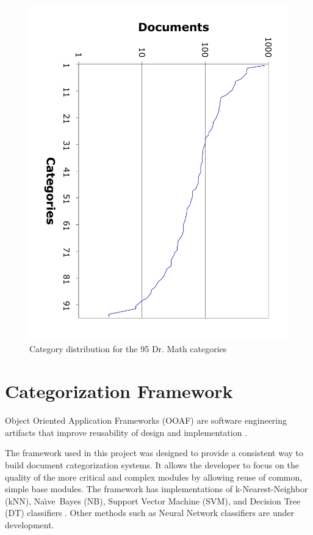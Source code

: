 \documentclass{article}
\newcommand{\naive}{Na\"\i ve}
\begin{document}
\begin{figure}
\includegraphics[angle=90,width=\linewidth]{cat-distribution}
\caption{Category distribution for the 95 Dr. Math categories}
\label{cat-distribution}
\end{figure}


\section{Categorization Framework}

Object Oriented Application Frameworks (OOAF) are software engineering artifacts 
that improve reusability of design and implementation \cite{fayad:97, fayad:99}.

The framework used in this project was designed to provide a
consistent way to build document categorization
systems.\cite{williams:02} It allows the developer to focus on the
quality of the more critical and complex modules by allowing reuse of
common, simple base modules.  The framework has
implementations of 
k-Nearest-Neighbor (kNN), \naive\ Bayes (NB), Support Vector Machine (SVM), and
Decision Tree (DT) classifiers \cite{yang:99, sebastiani:02}. Other methods
such as Neural Network \cite{calvo:00, calvo:01} classifiers are under development.
\end{document}
